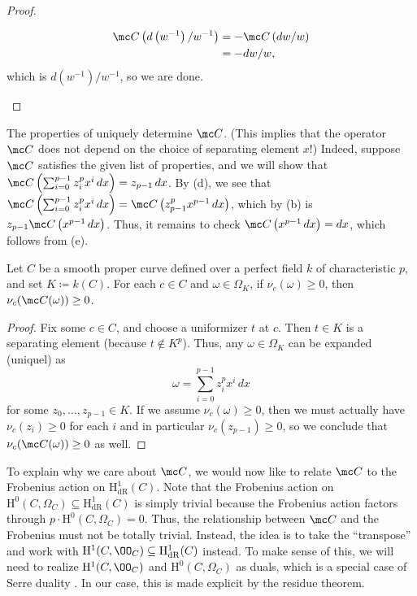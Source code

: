 \documentclass[../thesis.tex]{subfiles}
\begin{document}
\begin{proof}
\begin{enumerate}
		\begin{align*}
			\mc C\left(d\left(w^{-1}\right)/w^{-1}\right) &= -\mc C\left(dw/w\right) \\
			&= -dw/w,
		\end{align*}
		which is $d\left(w^{-1}\right)/w^{-1}$, so we are done.
		\qedhere
	\end{enumerate}
\end{proof}
\begin{remark}
	The properties of  uniquely determine $\mc C$. (This implies that the operator $\mc C$ does not depend on the choice of separating element $x$!) Indeed, suppose $\mc C$ satisfies the given list of properties, and we will show that $\mc C\left(\sum_{i=0}^{p-1}z_i^px^i\,dx\right)=z_{p-1}\,dx$. By (d), we see that $\mc C\left(\sum_{i=0}^{p-1}z_i^px^i\,dx\right)=\mc C\left(z_{p-1}^px^{p-1}\,dx\right)$, which by (b) is $z_{p-1}\mc C\left(x^{p-1}\,dx\right)$. Thus, it remains to check $\mc C\left(x^{p-1}\,dx\right)=dx$, which follows from (e).
\end{remark}
\begin{lemma}
	Let $C$ be a smooth proper curve defined over a perfect field $k$ of characteristic $p$, and set $K\coloneqq k(C)$. For each $c\in C$ and $\omega\in\Omega_K$, if $\nu_c(\omega)\ge0$, then $\nu_c(\mc C(\omega))\ge0$.
\end{lemma}
\begin{proof}
	Fix some $c\in C$, and choose a uniformizer $t$ at $c$. Then $t\in K$ is a separating element (because $t\notin K^p$). Thus, any $\omega\in\Omega_K$ can be expanded (uniquel) as
	\[\omega=\sum_{i=0}^{p-1}z_i^px^i\,dx\]
	for some $z_0,\ldots,z_{p-1}\in K$. If we assume $\nu_c(\omega)\ge0$, then we must actually have $\nu_c(z_i)\ge0$ for each $i$ and in particular $\nu_c(z_{p-1})\ge0$, so we conclude that $\nu_c(\mc C(\omega))\ge0$ as well.
\end{proof}
To explain why we care about $\mc C$, we would now like to relate $\mc C$ to the Frobenius action on $\mathrm H^1_{\mathrm{dR}}(C)$. Note that the Frobenius action on $\mathrm H^0(C,\Omega_C)\subseteq\mathrm H^1_{\mathrm{dR}}(C)$ is simply trivial because the Frobenius action factors through $p\cdot\mathrm H^0(C,\Omega_C)=0$. Thus, the relationship between $\mc C$ and the Frobenius must not be totally trivial. Instead, the idea is to take the ``transpose'' and work with $\mathrm H^1(C,\OO_C)\subseteq\mathrm H^1_{\mathrm{dR}}(C)$ instead. To make sense of this, we will need to realize $\mathrm H^1(C,\OO_C)$ and $\mathrm H^0(C,\Omega_C)$ as duals, which is a special case of Serre duality \cite[Theorem~II.7.6]{hartshorne}. In our case, this is made explicit by the residue theorem.
\end{document}
